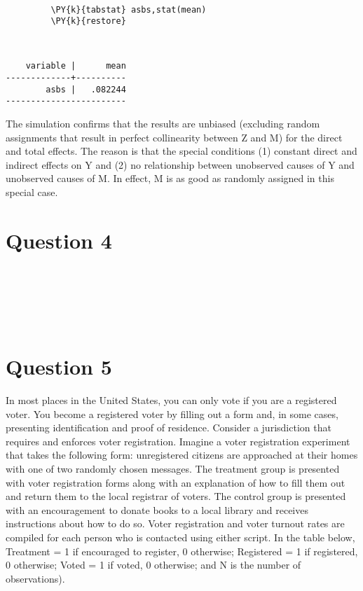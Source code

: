 \documentclass[11pt,notitlepage]{article}\usepackage[]{graphicx}\usepackage[]{color}
\makeatletter
\newenvironment{kframe}{%
 \def\at@end@of@kframe{}%
 \ifinner\ifhmode%
  \def\at@end@of@kframe{\end{minipage}}%
  \begin{minipage}{\columnwidth}%
 \fi\fi%
 \def\FrameCommand##1{\hskip\@totalleftmargin \hskip-\fboxsep
 \colorbox{shadecolor}{##1}\hskip-\fboxsep
     \hskip-\linewidth \hskip-\@totalleftmargin \hskip\columnwidth}%
 \MakeFramed {\advance\hsize-\width
   \@totalleftmargin\z@ \linewidth\hsize
   \@setminipage}}%
 {\par\unskip\endMakeFramed%
 \at@end@of@kframe}
\newenvironment{knitrout}{}{} %
\makeatother
\begin{document}
\begin{enumerate}[a)]
\begin{knitrout}
\begin{kframe}
\begin{Verbatim}[commandchars=\\\{\}]
         
         \PY{k}{tabstat} asbs,stat(mean)
         \PY{k}{restore}
\end{Verbatim}

    \begin{Verbatim}[commandchars=\\\{\}]


    variable |      mean
-------------+----------
        asbs |   .082244
------------------------
    \end{Verbatim}
\end{kframe}
\end{knitrout}


The simulation confirms that the results are unbiased (excluding random assignments that result in perfect collinearity between Z and M) for the direct and total effects.  The reason is that the special conditions (1) constant direct and indirect effects on Y and (2) no relationship between unobserved causes of Y and unobserved causes of M.  In effect, M is as good as randomly assigned in this special case.  

\end{enumerate}


\section*{Question 4}
\begin{knitrout}
\color{fgcolor}\begin{kframe}
\begin{verbatim}






\end{verbatim}
\end{kframe}
\end{knitrout}


\section*{Question 5}
In most places in the United States, you can only vote if you are a registered voter. You become a registered voter by filling out a form and, in some cases, presenting identification and proof of residence. Consider a jurisdiction that requires and enforces voter registration. Imagine a voter registration experiment that takes the following form: unregistered citizens are approached at their homes with one of two randomly chosen messages. The treatment group is presented with voter registration forms along with an explanation of how to fill them out and return them to the local registrar of voters. The control group is presented with an encouragement to donate books to a local library and receives instructions about how to do so. Voter registration and voter turnout rates are compiled for each person who is contacted using either script. In the table below, Treatment = 1 if encouraged to register, 0 otherwise; Registered = 1 if registered, 0 otherwise; Voted = 1 if voted, 0 otherwise; and N is the number of observations).
\end{document}
